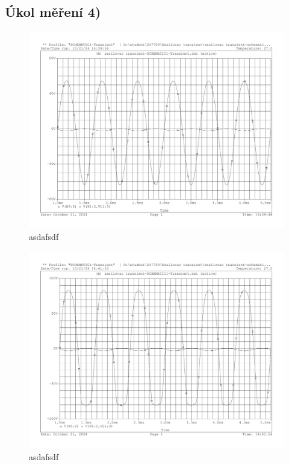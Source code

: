 \documentclass[a4paper, czech]{article}
\begin{document}
\subsection{Úkol měření 4)}

\begin{figure}[H]
    \centering
    \includegraphics[width=\textwidth]{charakteristiky/uloha4.pdf}
    \caption{asdafsdf}
\end{figure}

\begin{figure}[H]
    \centering
    \includegraphics[width=\textwidth]{charakteristiky/uloha4_2v.pdf}
    \caption{asdafsdf}
\end{figure}
\end{document}
